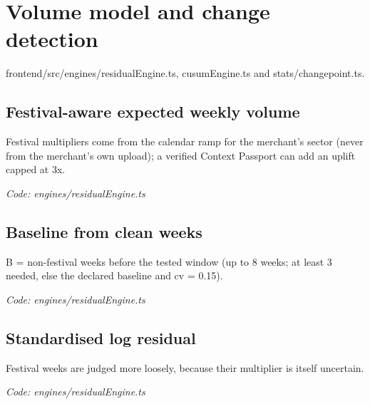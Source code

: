 \documentclass[11pt,a4paper]{article}
\newcommand{\where}[1]{\par{\small\itshape\color{mute}Code: #1}\par}
\begin{document}
\clearpage
\section{Volume model and change detection}
{\color{mute}frontend/src/engines/residualEngine.ts, cusumEngine.ts and stats/changepoint.ts.}

\subsection*{Festival-aware expected weekly volume}
\par\smallskip\noindent{}\par\smallskip
Festival multipliers come from the calendar ramp for the merchant's sector (never from the merchant's own upload); a verified Context Passport can add an uplift capped at 3x.
\where{engines/residualEngine.ts}

\subsection*{Baseline from clean weeks}
\par\smallskip\noindent{}\par\smallskip
\par\smallskip\noindent{}\par\smallskip
B = non-festival weeks before the tested window (up to 8 weeks; at least 3 needed, else the declared baseline and cv = 0.15).
\where{engines/residualEngine.ts}

\subsection*{Standardised log residual}
\par\smallskip\noindent{}\par\smallskip
Festival weeks are judged more loosely, because their multiplier is itself uncertain.
\where{engines/residualEngine.ts}
\end{document}
